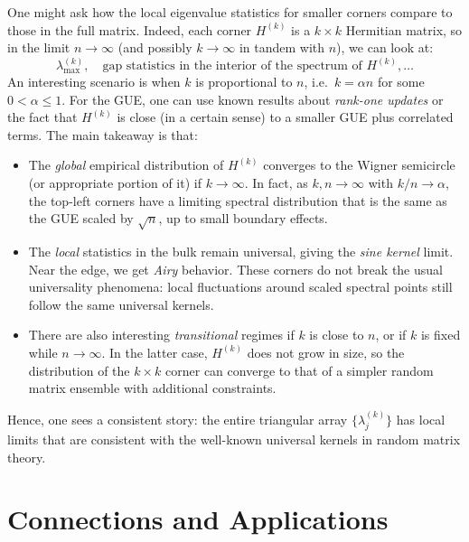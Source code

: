 \documentclass[letterpaper,11pt,oneside,reqno]{article}
\numberwithin{equation}{section}
\theoremstyle{definition}
\begin{document}
One might ask how the local eigenvalue statistics for smaller corners compare to those in the full matrix. Indeed, each corner $H^{(k)}$ is a $k\times k$ Hermitian matrix, so in the limit $n\to\infty$ (and possibly $k\to\infty$ in tandem with $n$), we can look at:
\[
	\lambda_{\max}^{(k)},\quad
	\text{gap statistics in the interior of the spectrum of }H^{(k)},\dots
\]
An interesting scenario is when $k$ is proportional to $n$, i.e.\ $k=\alpha n$ for some $0<\alpha\le1$. For the GUE, one can use known results about \emph{rank-one updates} or the fact that $H^{(k)}$ is close (in a certain sense) to a smaller GUE plus correlated terms. The main takeaway is that:
\begin{itemize}
	\item The \emph{global} empirical distribution of $H^{(k)}$ converges to the Wigner semicircle (or appropriate portion of it) if $k\to\infty$. In fact, as $k,n\to\infty$ with $k/n\to\alpha$, the top-left corners have a limiting spectral distribution that is the same as the GUE scaled by $\sqrt{n}$, up to small boundary effects.
\item The \emph{local} statistics in the bulk remain universal, giving the \emph{sine kernel} limit. Near the edge, we get \emph{Airy} behavior. These corners do not break the usual universality phenomena: local fluctuations around scaled spectral points still follow the same universal kernels.
\item There are also interesting \emph{transitional} regimes if $k$ is close to $n$, or if $k$ is fixed while $n\to\infty$. In the latter case, $H^{(k)}$ does not grow in size, so the distribution of the $k\times k$ corner can converge to that of a simpler random matrix ensemble with additional constraints.
\end{itemize}
Hence, one sees a consistent story: the entire triangular array $\{\lambda_j^{(k)}\}$ has local limits that are consistent with the well-known universal kernels in random matrix theory.

\section{Connections and Applications}
\label{sec:applications}
\end{document}
